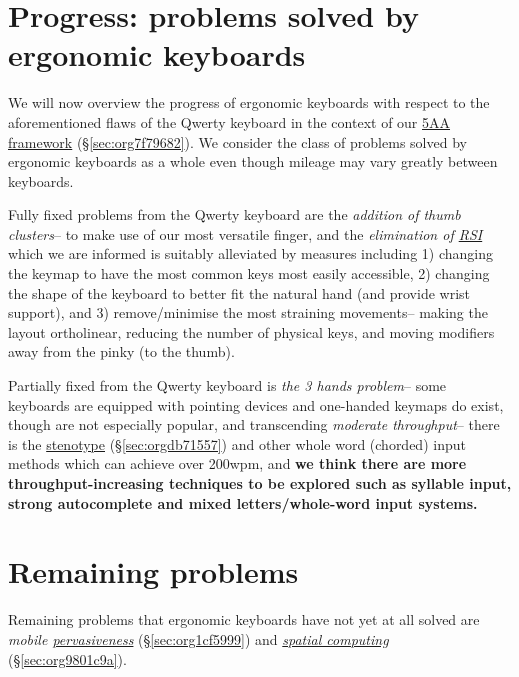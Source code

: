 \documentclass[logo,bsc,singlespacing,parskip]{infthesis}
\begin{document}
\section{Progress: problems solved by ergonomic keyboards}
\label{sec:org50e6363}
We will now overview the progress of ergonomic keyboards with respect to the aforementioned flaws of the Qwerty keyboard in the context of our \hyperref[sec:org7f79682]{5AA framework} (\S  \ref{sec:org7f79682}).
We consider the class of problems solved by ergonomic keyboards as a whole even though mileage may vary greatly between keyboards.

Fully fixed problems from the Qwerty keyboard are the \emph{addition of thumb clusters}-- to make use of our most versatile finger,  and the \emph{elimination of \hyperref[org77f0234]{RSI}} which we are informed is suitably alleviated by measures including 1) changing the keymap to have the most common keys most easily accessible, 2) changing the shape of the keyboard to better fit the natural hand (and provide wrist support), and 3) remove/minimise the most straining movements-- making the layout ortholinear, reducing the number of physical keys, and moving modifiers away from the pinky (to the thumb).

Partially fixed from the Qwerty keyboard is \emph{the 3 hands problem}-- some keyboards are equipped with pointing devices and one-handed keymaps do exist, though are not especially popular, and transcending \emph{moderate throughput}-- there is the  \hyperref[sec:orgdb71557]{stenotype} (\S  \ref{sec:orgdb71557}) and other whole word (chorded) input methods which can achieve over 200wpm, and \textbf{we think there are more throughput-increasing techniques to be explored such as syllable input, strong autocomplete and mixed letters/whole-word input systems.}

\section{Remaining problems}
\label{sec:org9b6e67d}
Remaining problems that ergonomic keyboards have not yet at all solved are \emph{mobile \hyperref[sec:org1cf5999]{pervasiveness}} (\S  \ref{sec:org1cf5999}) and \emph{\hyperref[sec:org9801c9a]{spatial computing}} (\S  \ref{sec:org9801c9a}).
\end{document}
